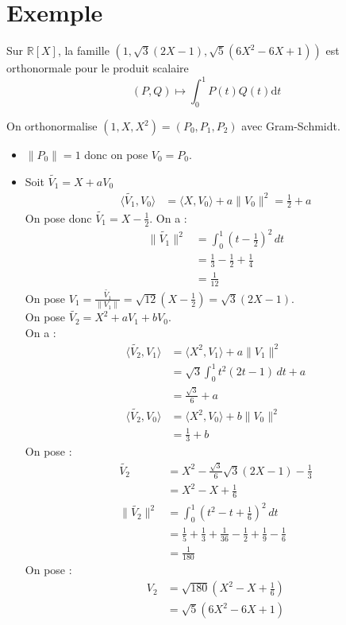 \documentclass[../main.tex]{subfiles}
\begin{document}
\section{Exemple}
\begin{tcolorbox}[title=Exemple 34.29, title filled=false, colframe=darkgreen, colback=darkgreen!10!white]
    Sur $\mathbb{R}[X]$, la famille $\left(1, \sqrt{3}(2 X-1), \sqrt{5}\left(6 X^2-6 X+1\right)\right)$ est orthonormale pour le produit scalaire
    $$(P, Q) \mapsto \int_0^1 P(t) Q(t) \mathrm{d} t$$
\end{tcolorbox}

\noindent On orthonormalise $(1, X, X^2) = (P_0, P_1, P_2)$ avec Gram-Schmidt. 
\begin{itemize}
    \item $\|P_0\| = 1$ donc on pose $V_0 = P_0$. 
    \item Soit $\tilde{V_1} = X + aV_0$
    \begin{align*}
        \langle \tilde{V_1}, V_0\rangle &= \langle X, V_0\rangle + a\|V_0\|^2 = \frac{1}{2} + a
    \end{align*}
    On pose donc $\tilde{V_1} = X - \frac{1}{2}$. On a : 
    \begin{align*}
        \|\tilde{V_1}\|^2 &= \int_{0}^{1} (t - \frac{1}{2})^2 \,dt \\
        &= \frac{1}{3} - \frac{1}{2} + \frac{1}{4} \\
        &= \frac{1}{12}
    \end{align*}
    On pose $V_1 = \frac{\tilde{V_1}}{\|V_1\|} = \sqrt{12}(X - \frac{1}{2}) = \sqrt{3}(2X - 1)$. \\
    On pose $\tilde{V_2} = X^2 + aV_1 + bV_0$. \\
    On a : 
    \begin{align*}
        \langle \tilde{V_2}, V_1\rangle &= \langle X^2, V_1\rangle + a\|V_1\|^2 \\
        &= \sqrt{3} \int_{0}^{1} t^2(2t-1) \,dt + a \\
        &= \frac{\sqrt{3}}{6} + a \\
        \langle \tilde{V_2}, V_0\rangle &= \langle X^2, V_0\rangle + b\|V_0\|^2 \\
        &= \frac{1}{3} + b
    \end{align*}
    On pose : 
    \begin{align*}
        \tilde{V_2} &= X^2 - \frac{\sqrt{3}}{6} \sqrt{3}(2X-1) - \frac{1}{3} \\
        &= X^2 - X + \frac{1}{6} \\
        \|\tilde{V_2}\|^2 &= \int_{0}^{1} (t^2 - t + \frac{1}{6})^2 \,dt \\
        &= \frac{1}{5} + \frac{1}{3} + \frac{1}{36} - \frac{1}{2} + \frac{1}{9} - \frac{1}{6} \\
        &= \frac{1}{180}
    \end{align*}
    On pose : 
    \begin{align*}
        V_2 &= \sqrt{180}(X^2 - X + \frac{1}{6}) \\
        &= \sqrt{5}(6X^2 - 6X + 1)
    \end{align*}
\end{itemize}
\end{document}
